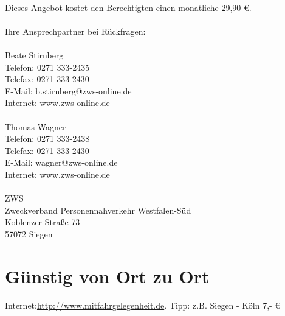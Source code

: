 \\
Dieses Angebot kostet den Berechtigten einen monatliche 29,90 \euro.\\
\\
Ihre Ansprechpartner bei Rückfragen:\\
\\
Beate Stirnberg\\
Telefon: 0271 333-2435\\
Telefax: 0271 333-2430\\
E-Mail: b.stirnberg@zws-online.de\\
Internet: www.zws-online.de\\
\\
Thomas Wagner\\
Telefon: 0271 333-2438\\
Telefax: 0271 333-2430\\
E-Mail: wagner@zws-online.de\\
Internet: www.zws-online.de\\
\\
ZWS\\
Zweckverband Personennahverkehr Westfalen-Süd\\
Koblenzer Straße 73\\
57072 Siegen

\section{Günstig von Ort zu Ort}
Internet:\href{http://www.mitfahrgelegenheit.de}{http://www.mitfahrgelegenheit.de}. Tipp: z.B. Siegen - Köln 7,- \euro
